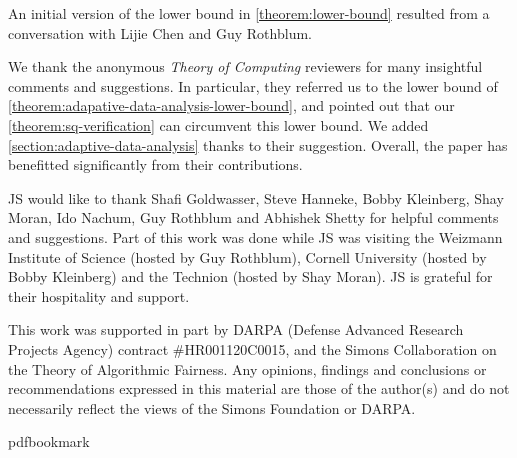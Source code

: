 \documentclass[11pt]{article}
\numberwithin{equation}{section}
\theoremstyle{definition}
\theoremstyle{plain}
\theoremstyle{definition}\newtheorem{notation}[theorem]{Notation}\theoremstyle{plain}\raggedbottom
\newcommand{\1}{\mathds{1}}
\begin{document}
{\small
	An initial version of the lower bound in \cref{theorem:lower-bound} resulted from a conversation with Lijie Chen and Guy Rothblum. 

	We thank the anonymous \emph{Theory of Computing} reviewers for many insightful comments and suggestions. In particular, they referred us to the lower bound of \cref{theorem:adapative-data-analysis-lower-bound}, and pointed out that our \cref{theorem:sq-verification} can circumvent this lower bound. We added \cref{section:adaptive-data-analysis} thanks to their suggestion. Overall, the paper has benefitted significantly from their contributions.

	JS would like to thank 
	Shafi Goldwasser,
	Steve Hanneke,
	Bobby Kleinberg,
	Shay Moran,
	Ido Nachum,
	Guy Rothblum
	and
	Abhishek Shetty
	for helpful comments and suggestions. Part of this work was done while JS was visiting the Weizmann Institute of Science (hosted by Guy Rothblum), Cornell University (hosted by Bobby Kleinberg) and the Technion (hosted by Shay Moran). JS is grateful for their hospitality and support.

	This work was supported in part by DARPA (Defense Advanced Research Projects Agency) contract \#HR001120C0015, and the Simons Collaboration on the Theory of Algorithmic Fairness. Any opinions, findings and conclusions or recommendations expressed in this material are those of the author(s) and do not necessarily reflect the views of the Simons Foundation or DARPA.
}

%

\newcommand{\prelim}{Preliminary version in\ }\newcommand{\prelims}{Preliminary
  versions in\ }
\providecommand{\bibhead}[1]{}
\expandafter\ifx\csname pdfbookmark\endcsname\relax%
  \providecommand{\tocrefpdfbookmark}{}
\else\providecommand{\tocrefpdfbookmark}{%
   \hypertarget{tocreferences}{}%
   \pdfbookmark[1]{References}{tocreferences}}%
\fi
\end{document}
